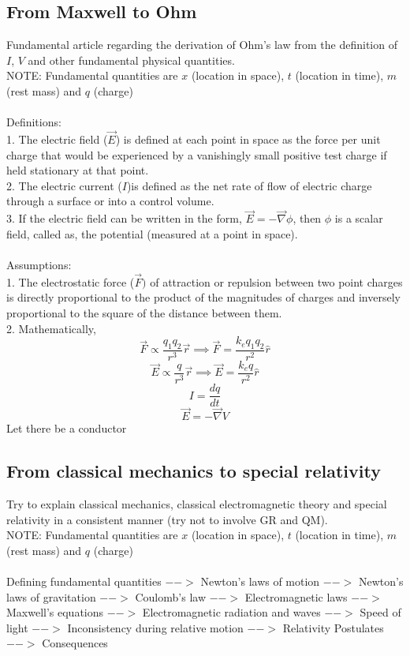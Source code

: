 \documentclass[12pt]{article}
\begin{document}
\subsection{From Maxwell to Ohm}
Fundamental article regarding the derivation of Ohm's law from the definition of $I$, $V$ and other fundamental physical quantities.\\
NOTE: Fundamental quantities are $x$ (location in space), $t$ (location in time), $m$ (rest mass) and $q$ (charge)\\ \\
Definitions:\\
1. The electric field ($\vec E$) is defined at each point in space as the force per unit charge that would be experienced by a vanishingly small positive test charge if held stationary at that point.\\
2. The electric current ($I$)is defined as the net rate of flow of electric charge through a surface or into a control volume.\\
3. If the electric field can be written in the form, $\vec E = -\vec\nabla \phi$, then $\phi$ is a scalar field, called as, the potential (measured at a point in space).\\ \\
Assumptions:\\
1. The electrostatic force ($\vec F)$ of attraction or repulsion between two point charges is directly proportional to the product of the magnitudes of charges and inversely proportional to the square of the distance between them.\\
2. 
Mathematically,
$$\vec F \propto \frac{q_1q_2}{r^3}\vec r \implies \vec F = \frac{k_eq_1q_2}{r^2}\hat r$$
$$\vec E \propto \frac{q}{r^3}\vec r \implies \vec E = \frac{k_eq}{r^2}\hat r$$
$$I=\frac{dq}{dt}$$
$$\vec E = -\vec\nabla V$$
Let there be a conductor


\subsection{From classical mechanics to special relativity}
Try to explain classical mechanics, classical electromagnetic theory and special relativity in a consistent manner (try not to involve GR and QM).\\
NOTE: Fundamental quantities are $x$ (location in space), $t$ (location in time), $m$ (rest mass) and $q$ (charge)\\ \\
Defining fundamental quantities $-->$ Newton's laws of motion $-->$ Newton's laws of gravitation $-->$ Coulomb's law $-->$ Electromagnetic laws $-->$ Maxwell's equations $-->$ Electromagnetic radiation and waves $-->$ Speed of light $-->$ Inconsistency during relative motion $-->$ Relativity Postulates $-->$ Consequences
\end{document}
